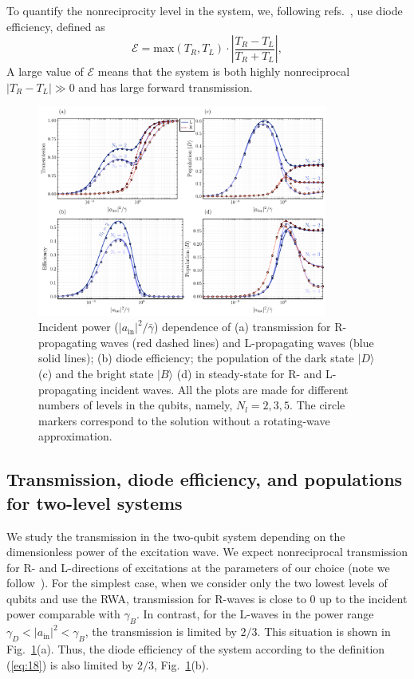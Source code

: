 \documentclass[lettersize,journal]{IEEEtran}
\begin{document}
To quantify the nonreciprocity level in the system, we, following refs.~\cite{dai_rectification_2015,muller_nonreciprocal_2017,rosario_hamann_nonreciprocity_2018}, use diode efficiency, defined as
\begin{equation}\label{eq:18}
    \mathcal{E} = \mathrm{max}(T_{R}, T_{L}) \cdot \left|\frac{T_{R} - T_{L}}{T_R + T_L}\right|,
\end{equation}
A large value of $\mathcal{E}$ means that the system is both highly nonreciprocal $|T_{R} - T_{L}| \gg 0$ and has large forward transmission. 

\begin{figure}[t]
    \centering
    \includegraphics[width=0.85\textwidth]{fig_3_delta-0.15}
    \caption{Incident power ($|a_\mathrm{in}|^2 / \bar{\gamma}$) dependence of (a) transmission for R-propagating waves (red dashed lines) and L-propagating waves (blue solid lines); (b) diode efficiency; the population of the dark state $|D\rangle$ (c) and the bright state $|B\rangle$ (d) in steady-state for R- and L-propagating incident waves. All the plots are made for different numbers of levels in the qubits, namely, $N_l = 2, 3, 5$. The circle markers correspond to the solution without a rotating-wave approximation.}
    \label{fig:03}
\end{figure}

\subsection{Transmission, diode efficiency, and populations for two-level systems}

We study the transmission in the two-qubit system depending on the dimensionless power of the excitation wave.
We expect nonreciprocal transmission for R- and L-directions of excitations at the parameters of our choice (note we follow~\cite{rosario_hamann_nonreciprocity_2018}).
For the simplest case, when we consider only the two lowest levels of qubits and use the RWA, transmission for R-waves is close to $0$ up to the incident power comparable with $\gamma_B$. 
In contrast, for the L-waves in the power range $\gamma_D<|a_\mathrm{in}|^2 < \gamma_B$, the transmission is limited by $2/3$.
This situation is shown in Fig.~\ref{fig:03}(a).
Thus, the diode efficiency of the system according to the definition (\ref{eq:18}) is also limited by $2/3$, Fig.~\ref{fig:03}(b).
\end{document}
